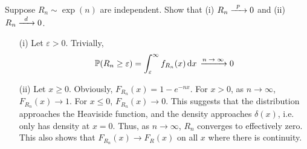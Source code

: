 \begin{example}
    Suppose $R_n \sim \exp(n)$ are independent. Show that (i) $R_n \ce{->[$p$]} 0$ and (ii) $R_n \ce{->[$d$]} 0$.
\end{example}
\begin{solution}
    \begin{enumerate}
        \item[(i)] Let $\varepsilon > 0$. Trivially,
        \begin{align}
            \probability(R_n \ge \varepsilon) = \int_\varepsilon^\infty f_{R_n}(x) \dd{x} \ce{->[$n \to \infty$]} 0
        \end{align}
        \item[(ii)] Let $x \ge 0$. Obviously, $F_{R_n}(x) = 1 - e^{-nx}$. For $x > 0$, as $n \to \infty$, $F_{R_n}(x) \to 1$. For $x \le 0$, $F_{R_n}(x) \to 0$. This suggests that the distribution approaches the Heaviside function, and the density approaches $\delta(x)$, i.e. only has density at $x = 0$. Thus, as $n \to \infty$, $R_n$ converges to effectively zero. This also shows that $F_{R_n}(x) \to F_R(x)$ on all $x$ where there is continuity.
    \end{enumerate}
\end{solution}


